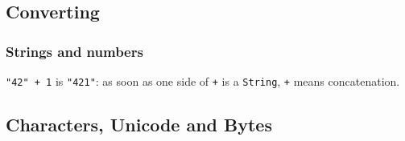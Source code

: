 \documentclass[aspectratio=169,10pt,compress]{beamer}
\begin{document}
\subsection[Convert]{Converting}




\begin{frame}[t,fragile] \frametitle{Strings and numbers}

  \vspace{0.3em}
  \small \texttt{"42" + 1} is \texttt{"421"}: as soon as one side of \texttt{+} is a \texttt{String}, \texttt{+} means concatenation.
\end{frame}





\subsection[Unicode]{Characters, Unicode and Bytes}{}{}

\end{document}
